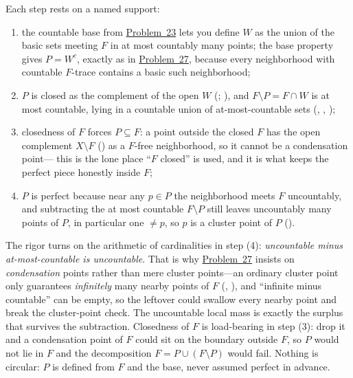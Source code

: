 \documentclass[main.tex]{subfiles}
\begin{document}
\begin{Reflection}
Each step rests on a named support:
\begin{enumerate}[leftmargin=1.7em,itemsep=3pt,topsep=2pt,label=\textnormal{(\arabic*)}]
  \item the countable base from \hyperlink{prob:23}{Problem~23} lets you define $W$ as the union of the
        basic sets meeting $F$ in at most countably many points; the base property gives $P=W^c$, exactly
        as in \hyperlink{prob:27}{Problem~27}, because every neighborhood with countable $F$-trace contains
        a basic such neighborhood;
  \item $P$ is closed as the complement of the open $W$ (;
        ), and $F\setminus P=F\cap W$ is at most countable, lying
        in a countable union of at-most-countable sets (,
        , );
  \item closedness of $F$ forces $P\subseteq F$: a point outside the closed $F$ has the open complement
        $X\setminus F$ () as a $F$-free neighborhood, so it cannot be a condensation point---
        this is the lone place ``$F$ closed'' is used, and it is what keeps the perfect piece honestly
        inside $F$;
  \item $P$ is perfect because near any $p\in P$ the neighborhood meets $F$ uncountably, and subtracting
        the at most countable $F\setminus P$ still leaves uncountably many points of $P$, in particular one
        $\neq p$, so $p$ is a cluster point of $P$ ().
\end{enumerate}

The rigor turns on the arithmetic of cardinalities in step (4): \emph{uncountable minus at-most-countable
is uncountable}. That is why \hyperlink{prob:27}{Problem~27} insists on \emph{condensation} points rather
than mere cluster points---an ordinary cluster point only guarantees \emph{infinitely} many nearby points
of $F$ (, ), and ``infinite minus countable'' can be
empty, so the leftover could swallow every nearby point and break the cluster-point check. The uncountable
local mass is exactly the surplus that survives the subtraction. Closedness of $F$ is load-bearing in step
(3): drop it and a condensation point of $F$ could sit on the boundary outside $F$, so $P$ would not lie
in $F$ and the decomposition $F=P\cup(F\setminus P)$ would fail. Nothing is circular: $P$ is defined from
$F$ and the base, never assumed perfect in advance.


\end{Reflection}
\end{document}
